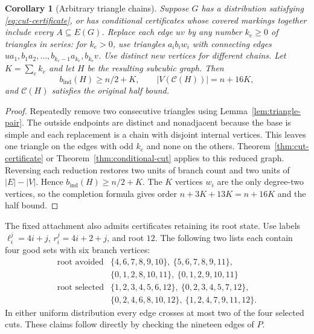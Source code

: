 \documentclass[11pt]{article}
\newtheorem{corollary}[theorem]{Corollary}
\newcommand{\bind}{b_{\mathrm{ind}}}
\begin{document}
\begin{corollary}[Arbitrary triangle chains]\label{cor:triangle-chains}
Suppose $G$ has a distribution satisfying
\eqref{eq:cut-certificate}, or has conditional certificates whose
covered markings together include every $A\subseteq E(G)$.
Replace each edge $uv$ by any number
$k_e\geq0$ of triangles in series: for $k_e>0$, use
triangles $a_i b_i w_i$ with connecting edges
$ua_1,b_1a_2,\ldots,b_{k_e-1}a_{k_e},b_{k_e}v$.
Use distinct new vertices for different chains.
Let $K=\sum_e k_e$ and let $H$ be the resulting subcubic graph.
Then
\[
 \bind(H)\geq n/2+K,\qquad
 |V(\mathcal C(H))|=n+16K,
\]
and $\mathcal C(H)$ satisfies the original half bound.
\end{corollary}
\begin{proof}
Repeatedly remove two consecutive triangles using
Lemma~\ref{lem:triangle-pair}. The outside endpoints are distinct
and nonadjacent because the base is simple and each replacement
is a chain with disjoint internal vertices. This leaves one
triangle on the edges with odd $k_e$ and none on the others.
Theorem~\ref{thm:cut-certificate} or
Theorem~\ref{thm:conditional-cut} applies to this reduced graph.
Reversing each reduction restores two units of branch count and
two units of $|E|-|V|$. Hence $\bind(H)\geq n/2+K$.
The $K$ vertices $w_i$ are the only degree-two vertices, so the
completion formula gives order $n+3K+13K=n+16K$ and the half bound.
\end{proof}

The fixed attachment also admits certificates retaining its root
state. Use labels $\ell_i^j=4i+j$, $r_i^j=4i+2+j$, and root $12$.
The following two lists each contain four good sets with six branch
vertices:
\[
\begin{array}{c|l}
\text{root avoided}&
\{4,6,7,8,9,10\},\ \{5,6,7,8,9,11\},\\
&\{0,1,2,8,10,11\},\ \{0,1,2,9,10,11\}\\[2pt]
\text{root selected}&
\{1,2,3,4,5,6,12\},\ \{0,2,3,4,5,7,12\},\\
&\{0,2,4,6,8,10,12\},\ \{1,2,4,7,9,11,12\}.
\end{array}
\]
In either uniform distribution every edge crosses at most two of
the four selected cuts. These claims follow directly by checking
the nineteen edges of $P$.
\end{document}
